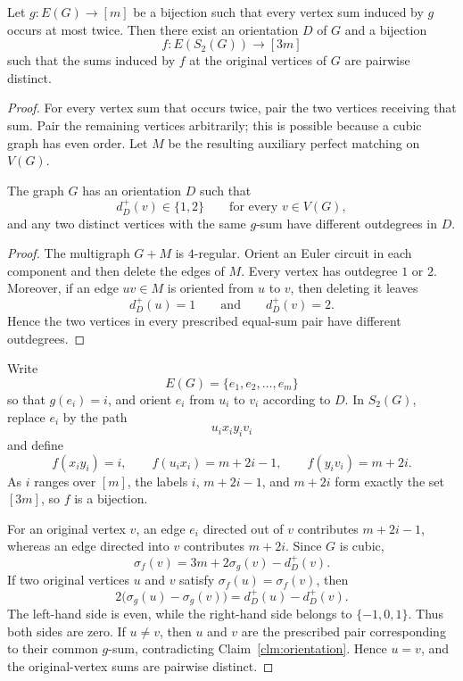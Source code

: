 \documentclass[10pt,a4paper]{amsart}
\begin{document}
\begin{lemma}
\label{lem:orientation-transfer}
Let \(g:E(G)\to[m]\) be a bijection such that every vertex sum induced by
\(g\) occurs at most twice. Then there exist an orientation \(D\) of \(G\)
and a bijection
\[
f:E(S_2(G))\longrightarrow[3m]
\]
such that the sums induced by \(f\) at the original vertices of \(G\) are
pairwise distinct.
\end{lemma}

\begin{proof}
For every vertex sum that occurs twice, pair the two vertices receiving
that sum. Pair the remaining vertices arbitrarily; this is possible
because a cubic graph has even order. Let \(M\) be the resulting
auxiliary perfect matching on \(V(G)\).

\begin{claim}
\label{clm:orientation}
The graph \(G\) has an orientation \(D\) such that
\[
d_D^+(v)\in\{1,2\}
\qquad\text{for every }v\in V(G),
\]
and any two distinct vertices with the same \(g\)-sum have different
outdegrees in \(D\).
\end{claim}

\begin{proof}
The multigraph \(G+M\) is \(4\)-regular. Orient an Euler circuit in each
component and then delete the edges of \(M\). Every vertex has outdegree
\(1\) or \(2\). Moreover, if an edge \(uv\in M\) is oriented from \(u\)
to \(v\), then deleting it leaves
\[
d_D^+(u)=1
\qquad\text{and}\qquad
d_D^+(v)=2.
\]
Hence the two vertices in every prescribed equal-sum pair have different
outdegrees.
\end{proof}

Write
\[
E(G)=\{e_1,e_2,\ldots,e_m\}
\]
so that \(g(e_i)=i\), and orient \(e_i\) from \(u_i\) to \(v_i\)
according to \(D\). In \(S_2(G)\), replace \(e_i\) by the path
\[
u_i x_i y_i v_i
\]
and define
\[
f(x_i y_i)=i,\qquad
f(u_i x_i)=m+2i-1,\qquad
f(y_i v_i)=m+2i.
\]
As \(i\) ranges over \([m]\), the labels \(i\), \(m+2i-1\), and \(m+2i\)
form exactly the set \([3m]\), so \(f\) is a bijection.

For an original vertex \(v\), an edge \(e_i\) directed out of \(v\)
contributes \(m+2i-1\), whereas an edge directed into \(v\) contributes
\(m+2i\). Since \(G\) is cubic,
\[
\sigma_f(v)=3m+2\sigma_g(v)-d_D^+(v).
\]
If two original vertices \(u\) and \(v\) satisfy
\(\sigma_f(u)=\sigma_f(v)\), then
\[
2\bigl(\sigma_g(u)-\sigma_g(v)\bigr)
=
d_D^+(u)-d_D^+(v).
\]
The left-hand side is even, while the right-hand side belongs to
\(\{-1,0,1\}\). Thus both sides are zero. If \(u\ne v\), then \(u\) and
\(v\) are the prescribed pair corresponding to their common \(g\)-sum,
contradicting Claim~\ref{clm:orientation}. Hence \(u=v\), and the
original-vertex sums are pairwise distinct.
\end{proof}
\end{document}
